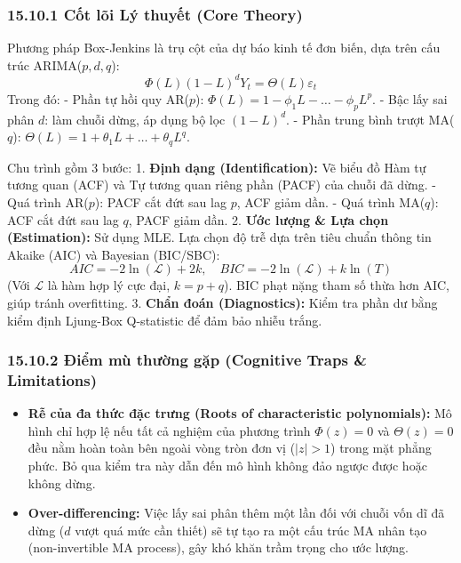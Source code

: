 \documentclass[
]{article}
\providecommand{\tightlist}{%
  \setlength{\itemsep}{0pt}\setlength{\parskip}{0pt}}
\begin{document}
\subsubsection{15.10.1 Cốt lõi Lý thuyết (Core
Theory)}\label{cux1ed1t-luxf5i-luxfd-thuyux1ebft-core-theory-58}

Phương pháp Box-Jenkins là trụ cột của dự báo kinh tế đơn biến, dựa trên
cấu trúc ARIMA(\(p, d, q\)):
\[ \Phi(L) (1-L)^d Y_t = \Theta(L) \varepsilon_t \] Trong đó: - Phần tự
hồi quy AR(\(p\)): \(\Phi(L) = 1 - \phi_1 L - \dots - \phi_p L^p\). -
Bậc lấy sai phân \(d\): làm chuỗi dừng, áp dụng bộ lọc \((1-L)^d\). -
Phần trung bình trượt MA(\(q\)):
\(\Theta(L) = 1 + \theta_1 L + \dots + \theta_q L^q\).

Chu trình gồm 3 bước: 1. \textbf{Định dạng (Identification):} Vẽ biểu đồ
Hàm tự tương quan (ACF) và Tự tương quan riêng phần (PACF) của chuỗi đã
dừng. - Quá trình AR(\(p\)): PACF cắt đứt sau lag \(p\), ACF giảm dần. -
Quá trình MA(\(q\)): ACF cắt đứt sau lag \(q\), PACF giảm dần. 2.
\textbf{Ước lượng \& Lựa chọn (Estimation):} Sử dụng MLE. Lựa chọn độ
trễ dựa trên tiêu chuẩn thông tin Akaike (AIC) và Bayesian (BIC/SBC):
\[ AIC = -2 \ln(\mathcal{L}) + 2k, \quad BIC = -2 \ln(\mathcal{L}) + k \ln(T) \]
(Với \(\mathcal{L}\) là hàm hợp lý cực đại, \(k=p+q\)). BIC phạt nặng
tham số thừa hơn AIC, giúp tránh overfitting. 3. \textbf{Chẩn đoán
(Diagnostics):} Kiểm tra phần dư bằng kiểm định Ljung-Box Q-statistic để
đảm bảo nhiễu trắng.

\subsubsection{15.10.2 Điểm mù thường gặp (Cognitive Traps \&
Limitations)}\label{ux111iux1ec3m-muxf9-thux1b0ux1eddng-gux1eb7p-cognitive-traps-limitations-109}

\begin{itemize}
\tightlist
\item
  \textbf{Rễ của đa thức đặc trưng (Roots of characteristic
  polynomials):} Mô hình chỉ hợp lệ nếu tất cả nghiệm của phương trình
  \(\Phi(z) = 0\) và \(\Theta(z) = 0\) đều nằm hoàn toàn bên ngoài vòng
  tròn đơn vị (\(|z| > 1\)) trong mặt phẳng phức. Bỏ qua kiểm tra này
  dẫn đến mô hình không đảo ngược được hoặc không dừng.
\item
  \textbf{Over-differencing:} Việc lấy sai phân thêm một lần đối với
  chuỗi vốn dĩ đã dừng (\(d\) vượt quá mức cần thiết) sẽ tự tạo ra một
  cấu trúc MA nhân tạo (non-invertible MA process), gây khó khăn trầm
  trọng cho ước lượng.
\end{itemize}
\end{document}
